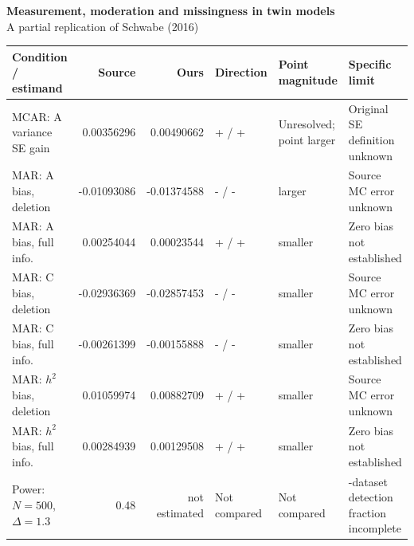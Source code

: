 \documentclass[11pt]{article}
\renewcommand{\arraystretch}{1.25}
\begin{document}
\begin{center}{\Large\bfseries Measurement, moderation and missingness in twin models}\\[3pt]
{\large A partial replication of Schwabe (2016)}\end{center}
\vspace{-10pt}
\begin{abstract}\small
We partly replicated Schwabe's (2016) finding that psychometric modelling improves behavioural-genetic inference \citep{schwabe2016}: all 108 reconstructed precision contrasts favour full information, with an illustrative published standard-error gain of 0.00356296 versus our 0.00490662. Whole-dissertation replication is incomplete: original empirical refits, repeated-dataset Bayesian recovery and direct power are not established. All 216 literal source variance-standard-error values disagree with our conditional comparison bands, and their comparability remains unresolved. Eleven full-information bias signs reverse the source; none excludes zero after adjustment. The numerical comparisons below preserve the estimates separately from those limits; conditional mathematics and a single completed posterior diagnostic do not establish the broader claims.
\end{abstract}
\vspace{-7pt}
{\small\setlength{\tabcolsep}{2pt}\renewcommand{\arraystretch}{1.25}
\noindent\begin{tabular}{@{}>{\raggedright\arraybackslash}p{99pt}r r >{\raggedright\arraybackslash}p{45pt}>{\raggedright\arraybackslash}p{85pt}>{\raggedright\arraybackslash}p{110pt}@{}}\toprule
Condition / estimand & Source & Ours & Direction & Point magnitude & Specific limit\\\midrule
MCAR: A variance SE gain & 0.00356296 & 0.00490662 & + / + & Unresolved; point larger & Original SE definition unknown\\
MAR: A bias, deletion & -0.01093086 & -0.01374588 & - / - & larger & Source MC error unknown\\
MAR: A bias, full info. & 0.00254044 & 0.00023544 & + / + & smaller & Zero bias not established\\
MAR: C bias, deletion & -0.02936369 & -0.02857453 & - / - & smaller & Source MC error unknown\\
MAR: C bias, full info. & -0.00261399 & -0.00155888 & - / - & smaller & Zero bias not established\\
MAR: $h^2$ bias, deletion & 0.01059974 & 0.00882709 & + / + & smaller & Source MC error unknown\\
MAR: $h^2$ bias, full info. & 0.00284939 & 0.00129508 & + / + & smaller & Zero bias not established\\
Power: $N=500$, $\Delta=1.3$ & 0.48 & \shortstack{not\\estimated} & Not compared & Not compared & 100-dataset detection fraction incomplete\\
\bottomrule\end{tabular}\par}
\end{document}
